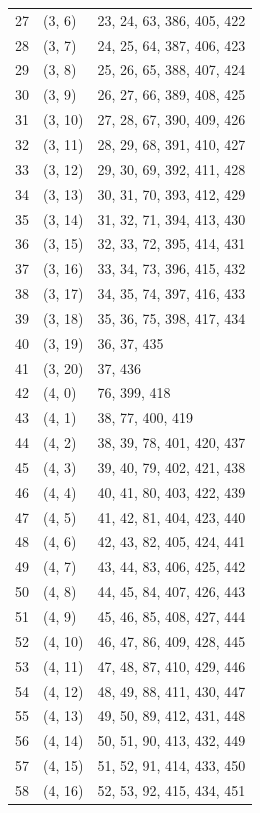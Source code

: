 \documentclass{article}
\begin{document}
\begin{longtable}{lll}
  27 & (3, 6) & 23, 24, 63, 386, 405, 422 \\
  28 & (3, 7) & 24, 25, 64, 387, 406, 423 \\
  29 & (3, 8) & 25, 26, 65, 388, 407, 424 \\
  30 & (3, 9) & 26, 27, 66, 389, 408, 425 \\
  31 & (3, 10) & 27, 28, 67, 390, 409, 426 \\
  32 & (3, 11) & 28, 29, 68, 391, 410, 427 \\
  33 & (3, 12) & 29, 30, 69, 392, 411, 428 \\
  34 & (3, 13) & 30, 31, 70, 393, 412, 429 \\
  35 & (3, 14) & 31, 32, 71, 394, 413, 430 \\
  36 & (3, 15) & 32, 33, 72, 395, 414, 431 \\
  37 & (3, 16) & 33, 34, 73, 396, 415, 432 \\
  38 & (3, 17) & 34, 35, 74, 397, 416, 433 \\
  39 & (3, 18) & 35, 36, 75, 398, 417, 434 \\
  40 & (3, 19) & 36, 37, 435 \\
  41 & (3, 20) & 37, 436 \\
  42 & (4, 0) & 76, 399, 418 \\
  43 & (4, 1) & 38, 77, 400, 419 \\
  44 & (4, 2) & 38, 39, 78, 401, 420, 437 \\
  45 & (4, 3) & 39, 40, 79, 402, 421, 438 \\
  46 & (4, 4) & 40, 41, 80, 403, 422, 439 \\
  47 & (4, 5) & 41, 42, 81, 404, 423, 440 \\
  48 & (4, 6) & 42, 43, 82, 405, 424, 441 \\
  49 & (4, 7) & 43, 44, 83, 406, 425, 442 \\
  50 & (4, 8) & 44, 45, 84, 407, 426, 443 \\
  51 & (4, 9) & 45, 46, 85, 408, 427, 444 \\
  52 & (4, 10) & 46, 47, 86, 409, 428, 445 \\
  53 & (4, 11) & 47, 48, 87, 410, 429, 446 \\
  54 & (4, 12) & 48, 49, 88, 411, 430, 447 \\
  55 & (4, 13) & 49, 50, 89, 412, 431, 448 \\
  56 & (4, 14) & 50, 51, 90, 413, 432, 449 \\
  57 & (4, 15) & 51, 52, 91, 414, 433, 450 \\
  58 & (4, 16) & 52, 53, 92, 415, 434, 451 \\

\end{longtable}
\end{document}
